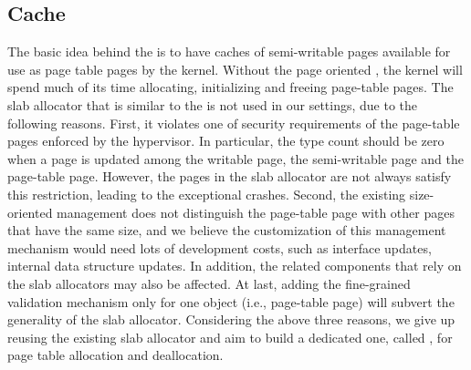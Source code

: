 
\subsection{\name Cache}
The basic idea behind the \cache is to have caches of semi-writable pages available for use as page table pages by the kernel. 
Without the page oriented \cache, the kernel will spend much of its time allocating, initializing and freeing page-table pages. 
The slab allocator that is similar to the \cache is not used in our settings, due to the following reasons.
First, it violates one of security requirements of the page-table pages enforced by the hypervisor.
In particular, the type count should be zero when a page is updated among the writable page, the semi-writable page and the page-table page.
However, the pages in the slab allocator are not always satisfy this restriction, leading to the exceptional crashes.
Second, the existing size-oriented management does not distinguish the page-table page with other pages that have the same size, and we believe the customization of this management mechanism would need lots of development costs, such as interface updates, internal data structure updates. 
In addition, the related components that rely on the slab allocators may also be affected.
At last, adding the fine-grained validation mechanism only for one object (i.e., page-table page) will subvert the generality of the slab allocator.
Considering the above three reasons, we give up reusing the existing slab allocator and aim to build a dedicated one, called \cache, for page table allocation and deallocation.

